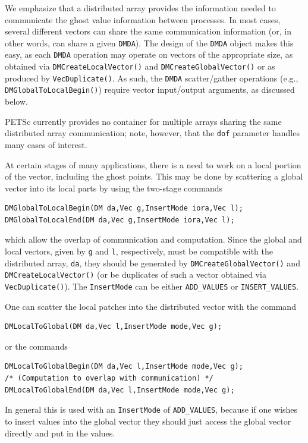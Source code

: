 We emphasize that a distributed array provides the information needed
to communicate the ghost value information between processes.  In most
cases, several different vectors can share the same communication
information (or, in other words, can share a given \lstinline{DMDA}).  The
design of the \lstinline{DMDA} object makes this easy, as each \lstinline{DMDA}
operation may operate on vectors of the appropriate size, as obtained
via \lstinline{DMCreateLocalVector()} and \lstinline{DMCreateGlobalVector()} or as
produced by \lstinline{VecDuplicate()}.  As such, the \lstinline{DMDA}
scatter/gather operations (e.g., \lstinline{DMGlobalToLocalBegin()}) require
vector input/output arguments, as discussed below.

PETSc currently provides no container for multiple arrays sharing the
same distributed array communication; note, however, that the \lstinline{dof}
parameter handles many cases of interest.

At certain stages of many applications, there is a need to work
on a local portion of the vector, including the ghost points.
This may be done by scattering a global vector into its
local parts by using the two-stage commands
\begin{lstlisting}
DMGlobalToLocalBegin(DM da,Vec g,InsertMode iora,Vec l);
DMGlobalToLocalEnd(DM da,Vec g,InsertMode iora,Vec l);
\end{lstlisting}
which allow the overlap of communication and computation.
Since the global and local vectors, given by \lstinline{g} and \lstinline{l}, respectively,
must be compatible with the distributed array, \lstinline{da}, they should be
generated by \lstinline{DMCreateGlobalVector()}
and \lstinline{DMCreateLocalVector()}
(or be duplicates of such a vector obtained via \lstinline{VecDuplicate()}).
The \lstinline{InsertMode} can be either \lstinline{ADD_VALUES} or \lstinline{INSERT_VALUES}.

One can scatter the local patches into the distributed vector
with the command
\begin{lstlisting}
DMLocalToGlobal(DM da,Vec l,InsertMode mode,Vec g);
\end{lstlisting}
or the commands
\begin{lstlisting}
DMLocalToGlobalBegin(DM da,Vec l,InsertMode mode,Vec g);
/* (Computation to overlap with communication) */
DMLocalToGlobalEnd(DM da,Vec l,InsertMode mode,Vec g);
\end{lstlisting}
In general this is used with an \lstinline{InsertMode} of \lstinline{ADD_VALUES}, because if one wishes to insert values into the global vector they should
just access the global vector directly and put in the values.

